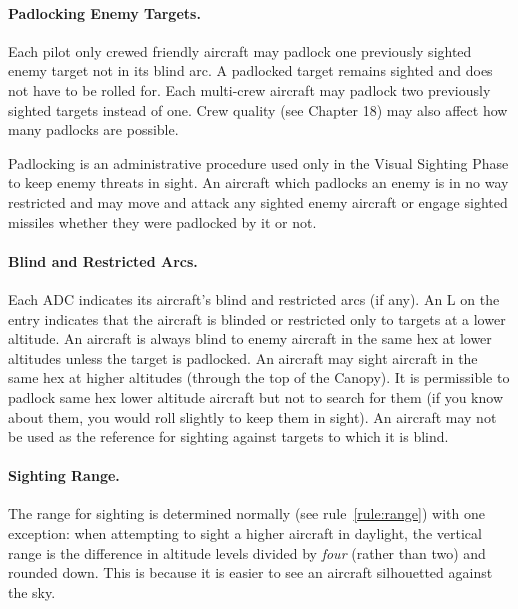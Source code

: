 {\paragraph{Padlocking Enemy Targets.} Each pilot only crewed friendly aircraft may padlock one previously sighted enemy target not in its blind arc. A padlocked target remains sighted and does not have to be rolled for. Each multi-crew aircraft may padlock two previously sighted targets instead of one. Crew quality (see Chapter 18) may also affect how many padlocks are possible.

Padlocking is an administrative procedure used only in the Visual Sighting Phase to keep enemy threats in sight. An aircraft which padlocks an enemy is in no way restricted and may move and attack any sighted enemy aircraft or engage sighted missiles whether they were padlocked by it or not. 

\paragraph{Blind and Restricted Arcs.} Each ADC indicates its aircraft's blind and restricted arcs (if any). An L on the entry indicates that the aircraft is blinded or restricted only to targets at a lower altitude. An aircraft is always blind to enemy aircraft in the same hex at lower altitudes unless the target is padlocked. An aircraft may sight aircraft in the same hex at higher altitudes (through the top of the Canopy). It is permissible to padlock same hex lower altitude aircraft but not to search for them (if you know about them, you would roll slightly to keep them in sight). An aircraft may not be used as the reference for sighting against targets to which it is blind.


}{

\paragraph{Sighting Range.} The range for sighting is determined normally (see rule~\ref{rule:range}) with one exception: when attempting to sight a higher aircraft in daylight, the vertical range is the difference in altitude levels divided by \emph{four} (rather than two) and rounded down. This is because it is easier to see an aircraft silhouetted against the sky.

}
